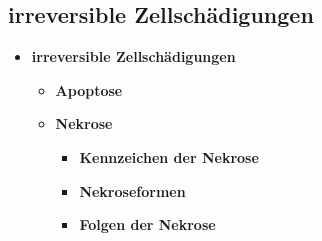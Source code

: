 \subsection{irreversible Zellschädigungen}
	\begin{itemize}
		\item \textbf{irreversible Zellschädigungen}
			\begin{itemize}
				\item \textbf{Apoptose}
				\item \textbf{Nekrose}
					\begin{itemize}
						\item \textbf{Kennzeichen der Nekrose}
						\item \textbf{Nekroseformen}
						\item \textbf{Folgen der Nekrose}
					\end{itemize}
			\end{itemize}
	\end{itemize}

